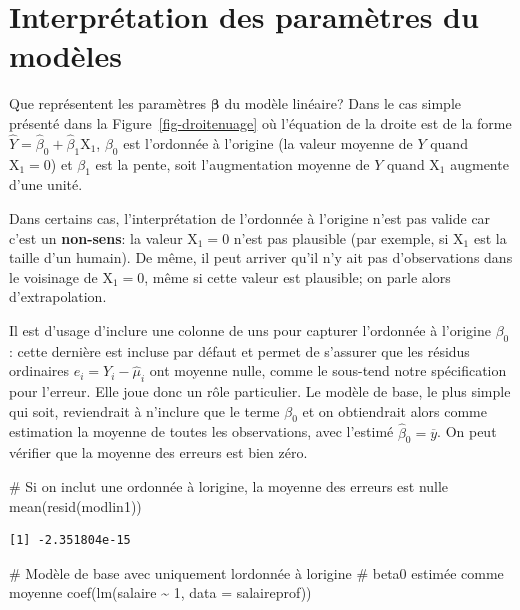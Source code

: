 \documentclass[
  11pt,
  letterpaper,
]{scrbook}
\newenvironment{Shaded}{\begin{snugshade}}{\end{snugshade}}
\newcommand{\AttributeTok}[1]{\textcolor[rgb]{0.40,0.45,0.13}{#1}}
\newcommand{\CommentTok}[1]{\textcolor[rgb]{0.37,0.37,0.37}{#1}}
\newcommand{\DecValTok}[1]{\textcolor[rgb]{0.68,0.00,0.00}{#1}}
\newcommand{\FunctionTok}[1]{\textcolor[rgb]{0.28,0.35,0.67}{#1}}
\newcommand{\NormalTok}[1]{\textcolor[rgb]{0.00,0.23,0.31}{#1}}
\newcommand{\SpecialCharTok}[1]{\textcolor[rgb]{0.37,0.37,0.37}{#1}}
\theoremstyle{definition}
\theoremstyle{remark}
\begin{document}
\hypertarget{interpruxe9tation-des-paramuxe8tres-du-moduxe8les}{%
\section{Interprétation des paramètres du
modèles}\label{interpruxe9tation-des-paramuxe8tres-du-moduxe8les}}

Que représentent les paramètres \(\boldsymbol{\beta}\) du modèle
linéaire? Dans le cas simple présenté dans la
Figure~\ref{fig-droitenuage} où l'équation de la droite est de la forme
\(\widehat{Y} = \widehat{\beta}_0 + \widehat{\beta}_1\mathrm{X}_1\),
\(\beta_0\) est l'ordonnée à l'origine (la valeur moyenne de \(Y\) quand
\(\mathrm{X}_1=0\)) et \(\beta_1\) est la pente, soit l'augmentation
moyenne de \(Y\) quand \(\mathrm{X}_1\) augmente d'une unité.

Dans certains cas, l'interprétation de l'ordonnée à l'origine n'est pas
valide car c'est un \textbf{non-sens}: la valeur \(\mathrm{X}_1=0\)
n'est pas plausible (par exemple, si \(\mathrm{X}_1\) est la taille d'un
humain). De même, il peut arriver qu'il n'y ait pas d'observations dans
le voisinage de \(\mathrm{X}_1=0\), même si cette valeur est plausible;
on parle alors d'extrapolation.

Il est d'usage d'inclure une colonne de uns pour capturer l'ordonnée à
l'origine \(\beta_0\): cette dernière est incluse par défaut et permet
de s'assurer que les résidus ordinaires \(e_i = Y_i - \widehat{\mu}_i\)
ont moyenne nulle, comme le sous-tend notre spécification pour l'erreur.
Elle joue donc un rôle particulier. Le modèle de base, le plus simple
qui soit, reviendrait à n'inclure que le terme \(\beta_0\) et on
obtiendrait alors comme estimation la moyenne de toutes les
observations, avec l'estimé \(\widehat{\beta}_0 = \overline{y}\). On
peut vérifier que la moyenne des erreurs est bien zéro.

\begin{Shaded}
\begin{Highlighting}[]
\CommentTok{\# Si on inclut une ordonnée à l\textquotesingle{}origine, la moyenne des erreurs est nulle}
\FunctionTok{mean}\NormalTok{(}\FunctionTok{resid}\NormalTok{(modlin1))}
\end{Highlighting}
\end{Shaded}

\begin{verbatim}
[1] -2.351804e-15
\end{verbatim}

\begin{Shaded}
\begin{Highlighting}[]
\CommentTok{\# Modèle de base avec uniquement l\textquotesingle{}ordonnée à l\textquotesingle{}origine}
\CommentTok{\# beta0 estimée comme moyenne}
\FunctionTok{coef}\NormalTok{(}\FunctionTok{lm}\NormalTok{(salaire }\SpecialCharTok{\textasciitilde{}} \DecValTok{1}\NormalTok{, }\AttributeTok{data =}\NormalTok{ salaireprof))}
\end{Highlighting}
\end{Shaded}
\end{document}
